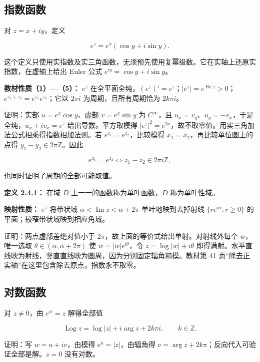\documentclass[11pt,a4paper]{article}
\begin{document}
\subsection{指数函数}\label{ch02-s4-ux6307ux6570ux51fdux6570}

对 \(z=x+iy\)，定义

\[
e^z=e^x(\cos y+i\sin y).
\]

这个定义只使用实指数及实三角函数，无须预先使用复幂级数。它在实轴上还原实指数，在虚轴上给出
Euler 公式 \(e^{iy}=\cos y+i\sin y\)。

\textbf{教材性质（1）---（5）：} \(e^z\)
在全平面全纯，\((e^z)'=e^z\)；\(|e^z|=e^{\operatorname{Re}z}>0\)；\(e^{z_1+z_2}=e^{z_1}e^{z_2}\)；它以
\(2\pi i\) 为周期，且所有周期恰为 \(2k\pi i\)。

证明：实部 \(u=e^x\cos y\)、虚部 \(v=e^x\sin y\) 为 \(C^\infty\)，且
\(u_x=v_y\)、\(u_y=-v_x\)，于是全纯，\(u_x+iv_x=e^z\)
给出导数。平方取模得
\(|e^z|^2=e^{2x}\)，故不取零值。用实三角加法公式相乘得指数相加法则。若
\(e^{z_1}=e^{z_2}\)，比较模得 \(x_1=x_2\)，再比较单位圆上的点得
\(y_1-y_2\in2\pi\mathbb Z\)。因此

\[
e^{z_1}=e^{z_2}\iff z_1-z_2\in2\pi i\mathbb Z,
\]

也同时证明了周期的全部可能取值。

\textbf{定义 2.4.1：} 在域 \(D\) 上一一的函数称为单叶函数，\(D\)
称为单叶性域。

\textbf{映射性质：} \(e^z\) 将带状域
\(\alpha<\operatorname{Im}z<\alpha+2\pi\) 单叶地映到去掉射线
\(\{re^{i\alpha}:r\ge0\}\) 的平面；较窄带状域映到相应角域。

证明：两点虚部差绝对值小于
\(2\pi\)，故上面的等价式给出单射。对射线外每个 \(w\)，唯一选取
\(\theta\in(\alpha,\alpha+2\pi)\) 使 \(w=|w|e^{i\theta}\)，令
\(z=\log|w|+i\theta\)
即得满射。水平直线映为射线，竖直直线映为圆周，因为分别固定辐角和模。教材第
41 页``除去正实轴''在这里包含除去原点，指数永不取零。

\subsection{对数函数}\label{ch02-s4-ux5bf9ux6570ux51fdux6570}

对 \(z\ne0\)，由 \(e^w=z\) 解得全部值

\[
\operatorname{Log}z=\log|z|+i\arg z+2k\pi i,\qquad k\in\mathbb Z.
\]

证明：写 \(w=u+iv\)，由模得 \(e^u=|z|\)，由辐角得
\(v=\arg z+2k\pi\)；反向代入可验证全部是解。\(z=0\) 没有对数。
\end{document}
